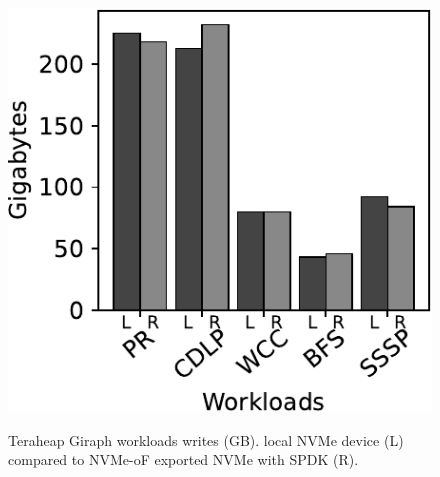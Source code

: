 \begin{figure}[H]
  \includegraphics[width=\linewidth]{figures/giraph_w.pdf}\\
\caption{Teraheap Giraph workloads writes (GB). local NVMe device (L) compared to NVMe-oF exported NVMe with SPDK (R).}
\label{fig:spark_w}
\end{figure}
